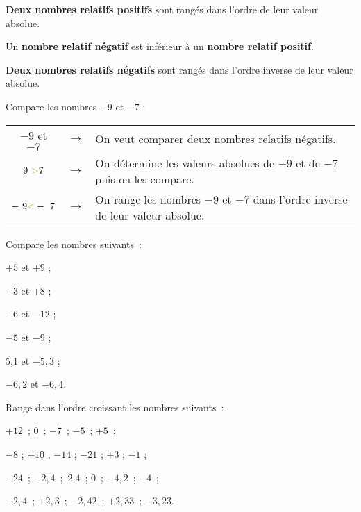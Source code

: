 \begin{methode*1}
\begin{aconnaitre}
\textbf{Deux nombres relatifs positifs} sont rangés dans l'ordre de leur valeur absolue.

Un \textbf{nombre relatif négatif} est inférieur à un \textbf{nombre relatif positif}.

\textbf{Deux nombres relatifs négatifs} sont rangés dans l'ordre inverse de leur valeur absolue.
\end{aconnaitre}

\begin{exemple*1}
Compare les nombres $- 9$ et $- 7$ : \\[0.5em]
\begin{tabular}{ccl} 
 $- 9$ et $- 7$ & $\longrightarrow$ & On veut comparer deux nombres relatifs négatifs. \\
 $9 \textcolor{H1}{>} 7$ & $\longrightarrow$ & On détermine les valeurs absolues de $- 9$ et de $- 7$ puis on les compare. \\
 $- 9 \textcolor{H1}{<} - 7$ & $\longrightarrow$ & On range les nombres $- 9$ et $- 7$ dans l'ordre inverse de leur valeur absolue. \\
 \end{tabular}
\end{exemple*1}


\exercice
Compare les nombres suivants :
\begin{colenumerate}{3}
 \item $+ 5$ et $+ 9$ ;
 \item $- 3$ et $+ 8$ ;
 \item $- 6$ et $- 12$ ;
 \item $- 5$ et $- 9$ ;
 \item 5,1 et $- 5,3$ ;
 \item $- 6,2$ et $- 6,4$.
 \end{colenumerate}

\exercice
Range dans l'ordre croissant les nombres suivants : 
\begin{colenumerate}{2}
 \item $+ 12$ ; 0 ; $- 7$ ; $- 5$ ; $+ 5$ ;
 \item $- 8$ ; $+ 10$ ; $- 14$ ; $- 21$ ; $+ 3$ ; $- 1$ ;
 \item $- 24$ ; $- 2,4$ ; 2,4 ; 0 ; $- 4,2$ ; $- 4$ ;
 \item $- 2,4$ ; $+ 2,3$ ; $- 2,42$ ; $+ 2,33$ ; $- 3,23$.
 \end{colenumerate}

\end{methode*1}


